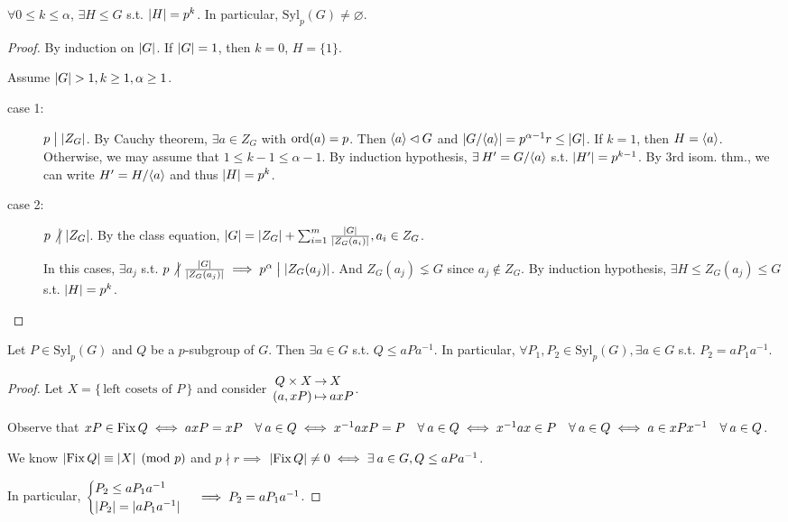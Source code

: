 \begin{theorem}
  $\forall 0 \le k \le \alpha$, $\exists H \le G$ s.t. $\abs{H} = p^k$.
  In particular, $\text{Syl}_p(G) \ne \varnothing$.

  \begin{proof}
    By induction on $\abs{G}$. If $\abs{G} = 1$, then $k = 0$, $H = \{1\}$.

    Assume $\abs{G} > 1, k \ge 1, \alpha \ge 1$.

    \begin{description}
      \item[case 1:] $p \Div \abs{Z_G}$. By Cauchy theorem,
        $\exists a \in Z_G$ with $\ord(a) = p$.
        Then $\gen{a} \lhd G$ and $\abs*{\quot{G}{\gen{a}}} = p^{\alpha-1} r
        \le \abs{G}$.
        If $k=1$, then $H = \gen{a}$.
        Otherwise, we may assume that $1\le k-1\le \alpha-1$. By induction
        hypothesis, $\exists H' = \quot{G}{\gen{a}}$ s.t. $\abs{H'} = p^{k-1}$.
        By 3rd isom. thm., we can write $H' = \quot{H}{\gen{a}}$ and thus
        $\abs{H} = p^k$.
      \item[case 2:] $p \nDiv \abs{Z_G}$. By the class equation,
        $\abs{G} = \abs{Z_G} + \sum_{i=1}^m \frac{\abs{G}}{\abs{Z_G(a_i)}},
        a_i \in Z_G$.

        In this cases, $\exists a_j$ s.t.
        $p \nDiv \frac{\abs{G}}{\abs{Z_G(a_j)}} \implies
        p^\alpha \Div \abs{Z_G(a_j)}$. And $Z_G(a_j) \lneq G$ since
        $a_j \notin Z_G$.
        By induction hypothesis, $\exists H \le Z_G(a_j) \le G$ s.t.
        $\abs{H} = p^k$. \qedhere
    \end{description}
  \end{proof}
\end{theorem}

\begin{theorem}
  Let $P \in \text{Syl}_p(G)$ and $Q$ be a $p$-subgroup of $G$. Then
  $\exists a \in G$ s.t. $Q \le aPa^{-1}$.
  In particular, $\forall P_1, P_2 \in \text{Syl}_p(G), \exists a \in G$
  s.t. $P_2 = aP_1a^{-1}$.
  \begin{proof}
    Let $X = \{\, \text{left cosets of $P$} \,\}$ and consider
    $\arraycolsep=1pt \begin{array}{rcl}
      Q \times X & \to & X \\
      (a, xP) & \mapsto & axP
    \end{array}$.

    Observe that $xP \in \Fix Q \iff axP = xP \quad \forall a \in Q \iff
    x^{-1}axP = P \quad \forall a \in Q \iff
    x^{-1}ax \in P \quad \forall a \in Q \iff
    a \in xPx^{-1} \quad \forall a \in Q$.

    We know $\abs{\Fix Q} \equiv \abs{X} \pmod p$ and $p \nmid r \implies$
    $\abs{\Fix Q} \ne 0 \iff \exists a \in G, Q \le aPa^{-1}$.

    In particular, $\begin{cases}
      P_2 \le aP_1a^{-1} \\
      \abs{P_2} = \abs{aP_1a^{-1}}
    \end{cases} \implies P_2 = aP_1a^{-1}$.
  \end{proof}
\end{theorem}

